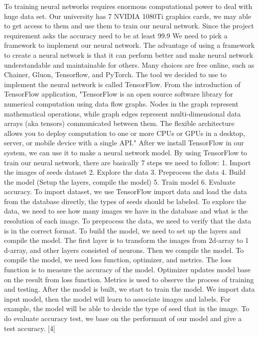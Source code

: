\documentclass{article}
\begin{document}
To training neural networks requires enormous computational power to deal with huge data set. Our university has 7 NVIDIA 1080Ti graphics cards, we may able to get access to them and use them to train our neural network. Since the project requirement asks the accuracy need to be at least 99.9 %
We need to pick a framework to implement our neural network. The advantage of using a framework to create a neural network is that it can perform better and make neural network understandable and maintainable for others. Many choices are free online, such as Chainer, Gluon, Tensorflow, and PyTorch. The tool we decided to use to implement the neural network is called TensorFlow.
From the introduction of TensorFlow application, "TensorFlow is an open source software library for numerical computation using data flow graphs. Nodes in the graph represent mathematical operations, while graph edges represent multi-dimensional data arrays (aka tensors) communicated between them. The flexible architecture allows you to deploy computation to one or more CPUs or GPUs in a desktop, server, or mobile device with a single API." After we install TensorFlow in our system, we can use it to make a neural network model.   
By using TensorFlow to train our neural network, there are basically 7 steps we need to follow: 1. Import the images of seeds dataset 2. Explore the data 3. Preprocess the data 4. Build the model (Setup the layers, compile the model) 5. Train model 6. Evaluate accuracy. To import dataset, we use TensorFlow import data and load the data from the database directly, the types of seeds should be labeled. To explore the data, we need to see how many images we have in the database and what is the resolution of each image. To preprocess the data, we need to verify that the data is in the correct format. To build the model, we need to set up the layers and compile the model. The first layer is to transform the images from 2d-array to 1 d-array, and other layers consisted of neurons. Then we compile the model. To compile the model, we need loss function, optimizer, and metrics. The loss function is to measure the accuracy of the model. Optimizer updates model base on the result from loss function. Metrics is used to observe the process of training and testing. After the model is built, we start to train the model. We import data input model, then the model will learn to associate images and labels. For example, the model will be able to decide the type of seed that in the image. To do evaluate accuracy test, we base on the performant of our model and give a test accuracy. [4]
\end{document}
